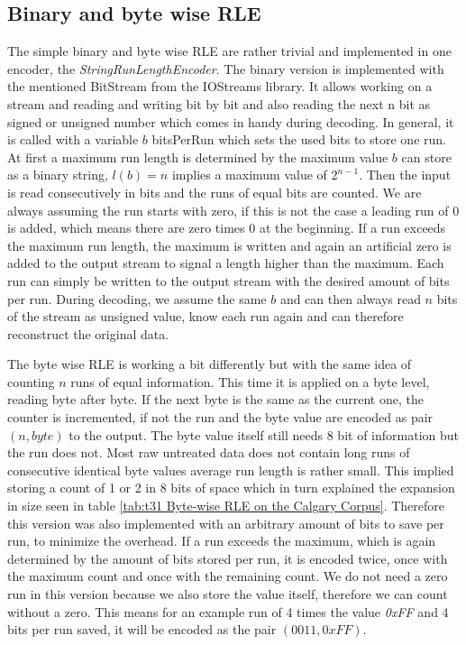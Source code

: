 {{{\subsection{Binary and byte wise RLE}
\par{
The simple binary and byte wise RLE are rather trivial and implemented in one encoder, the \textit{StringRunLengthEncoder}. The binary version is implemented with the mentioned BitStream from the IOStreams library. It allows working on a stream and reading and writing bit by bit and also reading the next n bit as signed or unsigned number which comes in handy during decoding. In general, it is called with a variable $b$ bitsPerRun which sets the used bits to store one run. At first a maximum run length is determined by the maximum value $b$ can store as a binary string, $l(b) = n$ implies a maximum value of $2^{n-1}$. Then the input is read consecutively in bits and the runs of equal bits are counted. We are always assuming the run starts with zero, if this is not the case a leading run of 0 is added, which means there are zero times 0 at the beginning. If a run exceeds the maximum run length, the maximum is written and again an artificial zero is added to the output stream to signal a length higher than the maximum. Each run can simply be written to the output stream with the desired amount of bits per run. During decoding, we assume the same $b$ and can then always read $n$ bits of the stream as unsigned value, know each run again and can therefore reconstruct the original data.
}
\par{
The byte wise RLE is working a bit differently but with the same idea of counting $n$ runs of equal information. This time it is applied on a byte level, reading byte after byte. If the next byte is the same as the current one, the counter is incremented, if not the run and the byte value are encoded as pair $(n, byte)$ to the output. The byte value itself still needs 8 bit of information but the run does not. Most raw untreated data does not contain long runs of consecutive identical byte values average run length is rather small. This implied storing a count of 1 or 2 in 8 bits of space which in turn explained the expansion in size seen in table \ref{tab:t31 Byte-wise RLE on the Calgary Corpus}. Therefore this version was also implemented with an arbitrary amount of bits to save per run, to minimize the overhead. If a run exceeds the maximum, which is again determined by the amount of bits stored per run, it is encoded twice, once with the maximum count and once with the remaining count. We do not need a zero run in this version because we also store the value itself, therefore we can count without a zero. This means for an example run of 4 times the value \textit{0xFF} and 4 bits per run saved, it will be encoded as the pair $(0011,0xFF)$.
}
}}}
